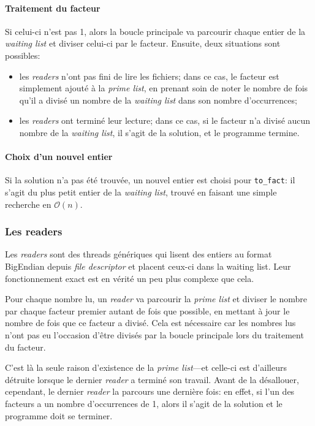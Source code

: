 \documentclass[a4paper,10pt]{article}
\begin{document}
\paragraph{Traitement du facteur}
Si celui-ci n'est pas 1, alors la boucle principale va parcourir chaque entier de la \emph{waiting list} et diviser celui-ci par le facteur. Ensuite, deux situations sont possibles:
\begin{itemize}
    \item les \emph{readers} n'ont pas fini de lire les fichiers; dans ce cas, le facteur est simplement ajouté à la \emph{prime list}, en prenant soin de noter le nombre de fois qu'il a divisé un nombre de la \emph{waiting list} dans son nombre d'occurrences;
    \item les \emph{readers} ont terminé leur lecture; dans ce cas, si le facteur n'a divisé aucun nombre de la \emph{waiting list}, il s'agit de la solution, et le programme termine.
\end{itemize}

\paragraph{Choix d'un nouvel entier}
Si la solution n'a pas été trouvée, un nouvel entier est choisi pour \texttt{to\_fact}: il s'agit du plus petit entier de la \emph{waiting list}, trouvé en faisant une simple recherche en $\mathcal{O}(n)$.

\subsubsection*{Les readers}

Les \emph{readers} sont des threads génériques qui lisent des entiers au format BigEndian depuis \emph{file descriptor} et placent ceux-ci dans la waiting list. Leur fonctionnement exact est en vérité un peu plus complexe que cela.

Pour chaque nombre lu, un \emph{reader} va parcourir la \emph{prime list} et diviser le nombre par chaque facteur premier autant de fois que possible, en mettant à jour le nombre de fois que ce facteur a divisé. Cela est nécessaire car les nombres lus n'ont pas eu l'occasion d'être divisés par la boucle principale lors du traitement du facteur.

C'est là la seule raison d'existence de la \emph{prime list}---et celle-ci est d'ailleurs détruite lorsque le dernier \emph{reader} a terminé son travail. Avant de la désallouer, cependant, le dernier \emph{reader} la parcours une dernière fois: en effet, si l'un des facteurs a un nombre d'occurrences de 1, alors il s'agit de la solution et le programme doit se terminer.
\end{document}
